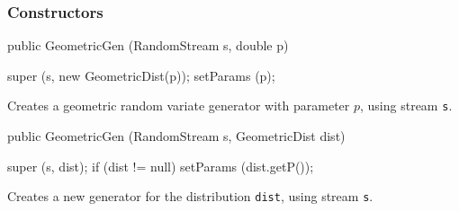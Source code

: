 \subsubsection* {Constructors}
\begin{code}

   public GeometricGen (RandomStream s, double p) \begin{hide} {
      super (s, new GeometricDist(p));
      setParams (p);
   }\end{hide}
\end{code}
\begin{tabb} Creates a geometric random variate generator with
  parameter $p$, using stream \texttt{s}.
\end{tabb}
\begin{code}

   public GeometricGen (RandomStream s, GeometricDist dist) \begin{hide} {
      super (s, dist);
      if (dist != null)
         setParams (dist.getP());
   }\end{hide}
\end{code}
\begin{tabb} Creates a new generator for the distribution \texttt{dist}, using 
    stream \texttt{s}.  
\end{tabb}



